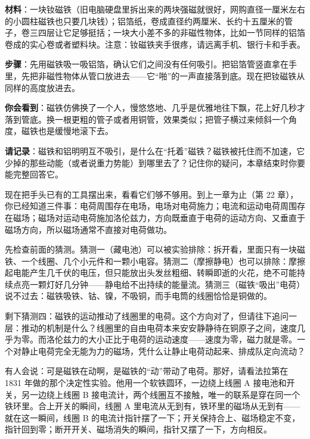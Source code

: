 \begin{experiment}[磁铁掉进金属管的慢动作]
\textbf{材料}：一块钕磁铁（旧电脑硬盘里拆出来的两块强磁就很好，网购直径一厘米左右的小圆柱磁铁也只要几块钱）；铝箔纸，卷成直径约两厘米、长约十五厘米的管子，卷三四层让它足够挺括；一块大小差不多的非磁性物体，比如一节同样的铝箔卷成的实心卷或者塑料块。注意：钕磁铁夹手很疼，请远离手机、银行卡和手表。

\textbf{步骤}：先用磁铁吸一吸铝箔，确认它们之间没有任何吸引。把铝箔管竖直拿在手里，先把非磁性物体从管口放进去——它“啪”的一声直接落到底。现在把钕磁铁从同样的高度放进去。

\textbf{你会看到}：磁铁仿佛换了一个人，慢悠悠地、几乎是优雅地往下飘，花上好几秒才落到管底。换一根更粗的管子或者用铜管，效果类似；把管子横过来倾斜一个角度，磁铁也是缓慢地滚下去。

\textbf{请记录}：磁铁和铝明明互不吸引，是什么在“托着”磁铁？磁铁被托住而不加速，它少掉的那些动能（或者说重力势能）到哪里去了？记住你的疑问，本章结束时你要能完整回答它。
\end{experiment}


现在把手头已有的工具摆出来，看看它们够不够用。到上一章为止（第 22 章），你已经知道三件事：电荷周围存在电场，电场对电荷施力；电流和运动电荷周围存在磁场；磁场对运动电荷施加洛伦兹力，方向既垂直于电荷的运动方向、又垂直于磁场方向，所以磁场通常不直接对电荷做功。

先检查前面的猜测。猜测一（藏电池）可以被实验排除：拆开看，里面只有一块磁铁、一个线圈、几个小元件和一颗小电容。猜测二（摩擦静电）也可以排除：摩擦起电能产生几千伏的电压，但只能放出头发丝粗细、转瞬即逝的火花，绝不可能持续点亮一颗灯好几分钟——静电给不出持续的能量流。猜测三（磁铁“吸出”电荷）说不过去：磁铁吸铁、钴、镍，不吸铜，而手电筒的线圈恰恰是铜做的。

剩下猜测四：磁铁的运动推动了线圈里的电荷。这个方向对了，但请往下追问一层：推动的机制是什么？线圈里的自由电荷本来安安静静待在铜原子之间，速度几乎为零。而洛伦兹力的大小正比于电荷的运动速度——速度为零，磁力就是零。一个对静止电荷完全无能为力的磁场，凭什么让静止电荷动起来、排成队定向流动？

有人会说：可是磁铁在动啊，是磁铁的“动”带动了电荷。那好，请看法拉第在 1831 年做的那个决定性实验。他用一个软铁圆环，一边绕上线圈 A 接电池和开关，另一边绕上线圈 B 接电流计，两个线圈互不接触，唯一的联系是穿在同一个铁环里。合上开关的瞬间，线圈 A 里电流从无到有，铁环里的磁场从无到有——就在这一瞬间，线圈 B 的电流计指针摆了一下；开关保持合上、磁场稳定不变，指针回到零；断开开关、磁场消失的瞬间，指针又摆了一下，方向相反。

